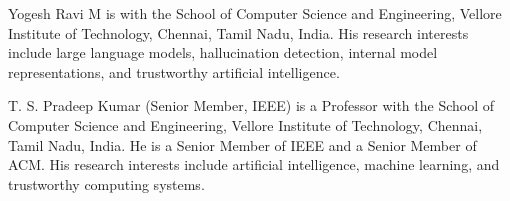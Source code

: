 \documentclass{ieeeaccess}
\begin{document}



\begin{IEEEbiographynophoto}{Yogesh Ravi M}
is with the School of Computer Science and Engineering, Vellore Institute of Technology, Chennai, Tamil Nadu, India. His research interests include large language models, hallucination detection, internal model representations, and trustworthy artificial intelligence.
\end{IEEEbiographynophoto}

\begin{IEEEbiographynophoto}{T. S. Pradeep Kumar}
(Senior Member, IEEE) is a Professor with the School of Computer Science and Engineering, Vellore Institute of Technology, Chennai, Tamil Nadu, India. He is a Senior Member of IEEE and a Senior Member of ACM. His research interests include artificial intelligence, machine learning, and trustworthy computing systems.
\end{IEEEbiographynophoto}

\EOD
\end{document}
